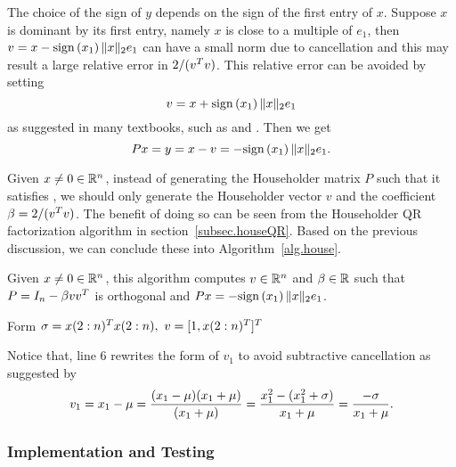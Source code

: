 The choice of the sign of $y$ depends on the sign of the first entry of $x$. Suppose $x$ is dominant by its first entry, namely $x$ is close to a multiple of $e_1$, then $v = x - \mathrm{sign}\left({x_1}\right)\|{x}\|_2e_1$ can have a small norm due to cancellation and this may result a large relative error in $2/(v^T v)$. This relative error can be avoided by setting
\begin{equation}\notag
  v = x + \mathrm{sign}\left({x_1}\right)\|{x}\|_2e_1
\end{equation}
as suggested in many textbooks, such as  and . Then we get
\begin{equation}\label{eq.Px}
  Px = y = x - v = -\mathrm{sign}\left({x_1}\right)\|{x}\|_2e_1.
\end{equation}

Given $x\neq {0} \in\mathbb{R}^n$, instead of generating the Householder matrix $P$ such that it satisfies , we should only generate the Householder vector $v$ and the coefficient $\beta = 2/(v^T v)$. The benefit of doing so can be seen from the Householder QR factorization algorithm in section~\ref{subsec.houseQR}. Based on the previous discussion, we can conclude these into  Algorithm~\ref{alg.house}.

\begin{algorithm}[ht]
\caption{Given $x\neq{0} \in\mathbb{R}^n$, this algorithm computes $v\in\mathbb{R}^n$ and $\beta\in\mathbb{R}$ such that $P = I_n - \beta vv^T$ is orthogonal and $Px = -\mathrm{sign}\left({x_1}\right) \|{x}\|_2e_1$.}
\label{alg.house}
\begin{algorithmic}[1]
  \State Form $\sigma = x(2:n)^T x(2:n),\ v = [1,x(2:n)^T]^T$
  \Else
  \EndIf
\end{algorithmic}
\end{algorithm}

Notice that, line 6 rewrites the form of $v_1$ to avoid subtractive cancellation as suggested by 
\begin{equation}\notag
  v_1 = x_1 - \mu = \frac{(x_1 - \mu)(x_1 +\mu)}{(x_1 + \mu)} = \frac{x_1^2 - (x_1^2 + \sigma)}{x_1 + \mu} = \frac{-\sigma}{x_1 + \mu}.
\end{equation}

\subsubsection{Implementation and Testing}

